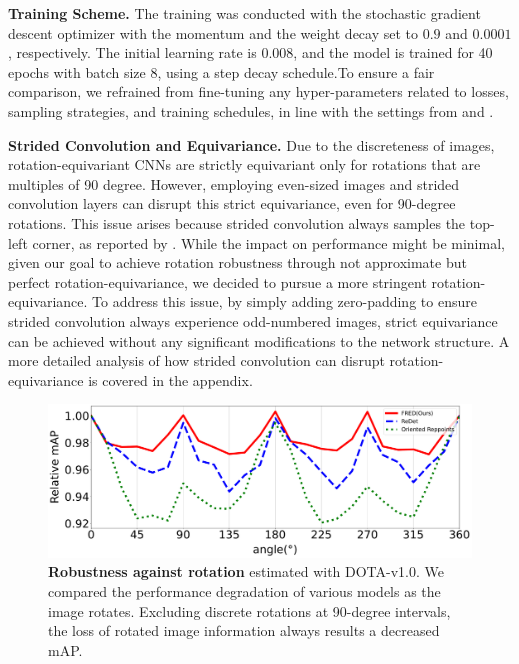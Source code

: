 \documentclass[letterpaper]{article} %
\begin{document}
\textbf{Training Scheme.} The training was conducted with the stochastic gradient descent optimizer with the momentum and the weight decay set to $0.9$ and $0.0001$, respectively. The initial learning rate is 0.008, and the model is trained for 40 epochs with batch size 8, using a step decay schedule.To ensure a fair comparison, we refrained from fine-tuning any hyper-parameters related to losses, sampling strategies, and training schedules, in line with the settings from  \citet{guo2021beyond} and \citet{li2022oriented}.


\textbf{Strided Convolution and Equivariance.} Due to the discreteness of images, rotation-equivariant CNNs are strictly equivariant only for rotations that are multiples of 90 degree.  However, employing even-sized images and strided convolution layers can disrupt this strict equivariance, even for 90-degree rotations. This issue arises because strided convolution always samples the top-left corner, as reported by \citet{romero2020attentive}. While the impact on performance might be minimal, given our goal to achieve rotation robustness through not approximate but perfect rotation-equivariance, we decided to pursue a more stringent rotation-equivariance. To address this issue, by simply adding zero-padding to ensure strided convolution always experience odd-numbered images, strict equivariance can be achieved without any significant modifications to the network structure. A more detailed analysis of how strided convolution can disrupt rotation-equivariance is covered in the appendix.
\begin{figure}[t]
    \centering
\includegraphics[width=\linewidth]{figs/figure5-v5.pdf}
\caption{\textbf{Robustness against rotation} estimated with DOTA-v1.0. We compared the performance degradation of various models as the image rotates. Excluding discrete rotations at 90-degree intervals, the loss of rotated image information always results a decreased mAP.}
\label{fig5}
\end{figure}
\end{document}
